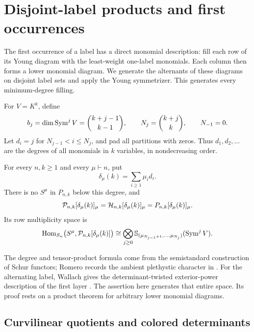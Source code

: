 \section{Disjoint-label products and first occurrences}
\label{sec:first}

The first occurrence of a label has a direct monomial description:
fill each row of its Young diagram with the least-weight one-label
monomials.  Each column then forms a lower monomial diagram.
We generate the alternants of these diagrams on disjoint label
sets and apply the Young symmetrizer.  This generates every
minimum-degree filling.

For $V=K^k$, define
\[
 b_j=\dim\operatorname{Sym}^jV=\binom{k+j-1}{k-1},\qquad
 N_j=\binom{k+j}{k},\qquad N_{-1}=0.
\]
Let $d_i=j$ for $N_{j-1}<i\leq N_j$, and pad all partitions with
zeros.  Thus $d_1,d_2,\ldots$ are the degrees of all monomials in $k$
variables, in nondecreasing order.

\begin{theorem}
\label{thm:r5-complete-first}
For every $n,k\geq1$ and every $\mu\vdash n$, put
\[
 \delta_\mu(k)=\sum_{i\geq1}\mu_i d_i.
\]
There is no $S^\mu$ in $P_{n,k}$ below this degree, and
\begin{equation}\label{eq:r5-first-equality}
 \mathcal P_{n,k}[\delta_\mu(k)]_\mu
 =\mathcal H_{n,k}[\delta_\mu(k)]_\mu
 =P_{n,k}[\delta_\mu(k)]_\mu.
\end{equation}
Its row multiplicity space is
\begin{equation}\label{eq:r5-first-character}
 \operatorname{Hom}_{S_n}\bigl(S^\mu,\mathcal P_{n,k}[\delta_\mu(k)]\bigr)
 \cong
 \bigotimes_{j\geq0}
 \mathbb S_{(\mu_{N_{j-1}+1},\ldots,\mu_{N_j})}(\operatorname{Sym}^j V).
\end{equation}
\end{theorem}

The degree and tensor-product formula come from the semistandard
construction of Schur functors; Romero records the ambient
plethystic character in \cite[Theorem~1.2 and \S2]{r5-Romero}.
For the alternating label, Wallach gives the determinant-twisted
exterior-power description of the first layer
\cite[Theorem~1]{r5-Wallach}.  The assertion here generates that
entire space.  Its proof rests on a product theorem for arbitrary
lower monomial diagrams.

\subsection{Curvilinear quotients and colored determinants}
\label{sec:r5-quot}

